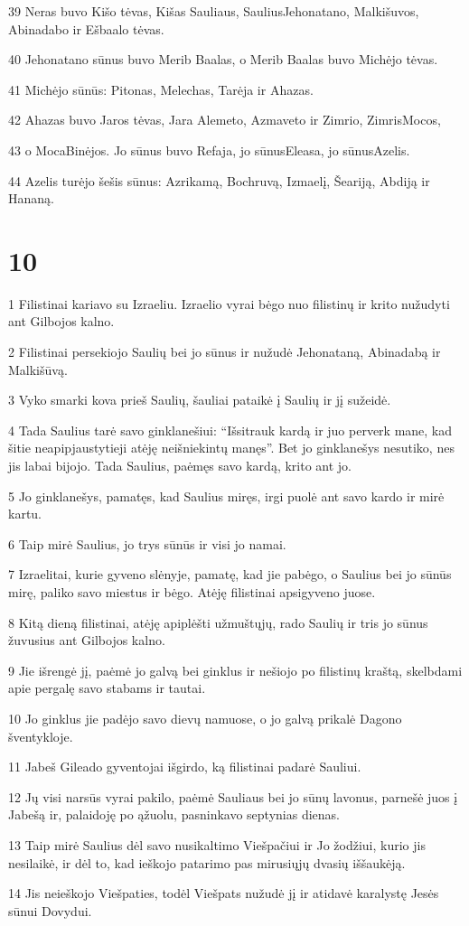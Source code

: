 \par 39 Neras buvo Kišo tėvas, Kišas­ Sauliaus, Saulius­Jehonatano, Malkišuvos, Abinadabo ir Ešbaalo tėvas. 
\par 40 Jehonatano sūnus buvo Merib Baalas, o Merib Baalas buvo Michėjo tėvas. 
\par 41 Michėjo sūnūs: Pitonas, Melechas, Tarėja ir Ahazas. 
\par 42 Ahazas buvo Jaros tėvas, Jara­ Alemeto, Azmaveto ir Zimrio, Zimris­Mocos, 
\par 43 o Moca­Binėjos. Jo sūnus buvo Refaja, jo sūnus­Eleasa, jo sūnus­Azelis. 
\par 44 Azelis turėjo šešis sūnus: Azrikamą, Bochruvą, Izmaelį, Šeariją, Abdiją ir Hananą.



\chapter{10}


\par 1 Filistinai kariavo su Izraeliu. Izraelio vyrai bėgo nuo filistinų ir krito nužudyti ant Gilbojos kalno. 
\par 2 Filistinai persekiojo Saulių bei jo sūnus ir nužudė Jehonataną, Abinadabą ir Malkišūvą. 
\par 3 Vyko smarki kova prieš Saulių, šauliai pataikė į Saulių ir jį sužeidė. 
\par 4 Tada Saulius tarė savo ginklanešiui: “Išsitrauk kardą ir juo perverk mane, kad šitie neapipjaustytieji atėję neišniekintų manęs”. Bet jo ginklanešys nesutiko, nes jis labai bijojo. Tada Saulius, paėmęs savo kardą, krito ant jo. 
\par 5 Jo ginklanešys, pamatęs, kad Saulius miręs, irgi puolė ant savo kardo ir mirė kartu. 
\par 6 Taip mirė Saulius, jo trys sūnūs ir visi jo namai. 
\par 7 Izraelitai, kurie gyveno slėnyje, pamatę, kad jie pabėgo, o Saulius bei jo sūnūs mirę, paliko savo miestus ir bėgo. Atėję filistinai apsigyveno juose. 
\par 8 Kitą dieną filistinai, atėję apiplėšti užmuštųjų, rado Saulių ir tris jo sūnus žuvusius ant Gilbojos kalno. 
\par 9 Jie išrengė jį, paėmė jo galvą bei ginklus ir nešiojo po filistinų kraštą, skelbdami apie pergalę savo stabams ir tautai. 
\par 10 Jo ginklus jie padėjo savo dievų namuose, o jo galvą prikalė Dagono šventykloje. 
\par 11 Jabeš Gileado gyventojai išgirdo, ką filistinai padarė Sauliui. 
\par 12 Jų visi narsūs vyrai pakilo, paėmė Sauliaus bei jo sūnų lavonus, parnešė juos į Jabešą ir, palaidoję po ąžuolu, pasninkavo septynias dienas. 
\par 13 Taip mirė Saulius dėl savo nusikaltimo Viešpačiui ir Jo žodžiui, kurio jis nesilaikė, ir dėl to, kad ieškojo patarimo pas mirusiųjų dvasių iššaukėją. 
\par 14 Jis neieškojo Viešpaties, todėl Viešpats nužudė jį ir atidavė karalystę Jesės sūnui Dovydui.



